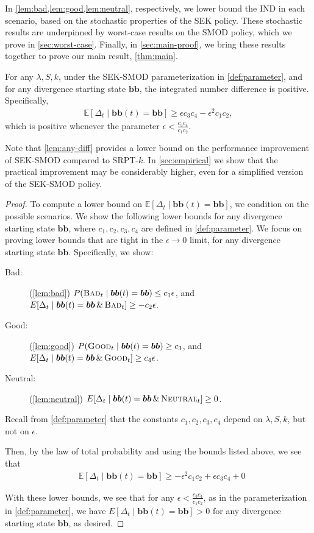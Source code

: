 \documentclass[acmsmall]{acmart}
\newcommand{\E}[1]{\mathbb{E}[#1]}
\newcommand{\bb}{\boldsymbol{b}}
\newcommand{\bbb}{\bb\bb}
\newcommand{\bad}{\textsc{Bad}}
\newcommand{\good}{\textsc{Good}}
\newcommand{\neutral}{\textsc{Neutral}}
\begin{document}
In \cref{lem:bad,lem:good,lem:neutral}, respectively,
we lower bound the IND in each scenario, based on the stochastic properties of the SEK policy.
These stochastic results are underpinned by worst-case results on the SMOD policy,
which we prove in \cref{sec:worst-case}.
Finally, in \cref{sec:main-proof}, we bring these results together to prove our main result, \cref{thm:main}.


\begin{lemma}
    \label{lem:any-diff}
    For any $\lambda, S, k$, under the SEK-SMOD parameterization in \cref{def:parameter},
    and for any divergence starting state $\bb\bb$, 
    the integrated number difference is positive. Specifically,
    \begin{align*}
        \E{\Delta_t \mid \bbb(t) = \bbb} \geq \epsilon c_3c_4 - \epsilon^2 c_1c_2,
    \end{align*}
    which is positive whenever the parameter $\epsilon<\frac{c_3c_4}{c_1c_2}$.
\end{lemma}

Note that \cref{lem:any-diff} provides a lower bound on the performance improvement of SEK-SMOD compared to SRPT-$k$. In \cref{sec:empirical} we show that the practical improvement may be considerably higher, even for a simplified version of the SEK-SMOD policy.

\begin{proof}
    To compute a lower bound on $\E{\Delta_t \mid \bbb(t) = \bbb}$, we condition on the possible scenarios. We show the following lower bounds for any divergence starting state $\bbb$, where $c_1, c_2, c_3, c_4$ are defined in \cref{def:parameter}. 
    We focus on proving lower bounds that are tight in the $\epsilon\to 0$ limit,  for any divergence starting state $\bbb$. Specifically, we show:
    \begin{description}
        \item[Bad:] (\cref{lem:bad}) $P(\bad_t \mid \bbb(t) = \bbb) \le c_1 \epsilon$, and $E[\Delta_t \mid \bbb(t) = \bbb \,\&\, \bad_t] \ge - c_2 \epsilon$.
        \item [Good:] (\cref{lem:good}) $P(\good_t \mid \bbb(t) = \bbb) \ge c_3$, and $E[\Delta_t \mid \bbb(t) = \bbb \,\&\, \good_t] \ge c_4 \epsilon$.
        \item [Neutral:] (\cref{lem:neutral}) $E[\Delta_t \mid \bbb(t) = \bbb \,\&\, \neutral_t] \ge 0$.
    \end{description}
    Recall from \cref{def:parameter} that the constants $c_1, c_2, c_3, c_4$ depend on $\lambda, S, k$, but not on $\epsilon$.

    Then, by the law of total probability and using the bounds listed above, we see that
    \begin{align*}
        & \E{\Delta_t \mid \bbb(t) = \bbb} \geq -\epsilon^2 c_1c_2 + \epsilon c_3 c_4 + 0
    \end{align*}
    
    With these lower bounds, we see that for any $\epsilon < \frac{c_3 c_4}{c_1 c_2}$, as in the parameterization in \cref{def:parameter}, we have $E[\Delta_t \mid \bbb(t)=\bbb] > 0$ for any divergence starting state $\bbb$, as desired.
\end{proof}
\end{document}
